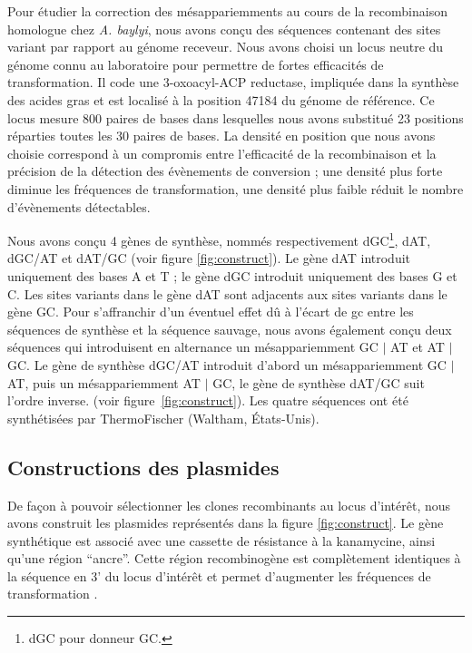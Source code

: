 Pour étudier la correction des mésappariemments au cours de la recombinaison
homologue chez \emph{A. baylyi}, nous avons conçu des séquences contenant des
sites variant par rapport au génome receveur. Nous avons choisi un locus neutre
du génome connu au laboratoire pour permettre de fortes efficacités de
transformation. Il code une 3-oxoacyl-ACP reductase, impliquée dans la synthèse
des acides gras\cite{vallenet_microscopeintegrated_2013} et est localisé à la
position \num{47184} du génome de référence. Ce locus mesure \num{800} paires de
bases dans lesquelles nous avons substitué \num{23} positions réparties toutes
les \num{30} paires de bases. La densité en position que nous avons choisie
correspond à un compromis entre l'efficacité de la recombinaison et la précision
de la détection des évènements de conversion ; une densité plus forte diminue
les fréquences de transformation, une densité plus faible réduit le nombre
d'évènements détectables.

Nous avons conçu 4 gènes de synthèse, nommés respectivement dGC\footnote{dGC
  pour donneur GC.}, dAT, dGC/AT et dAT/GC (voir figure \ref{fig:construct}). Le
gène dAT introduit uniquement des bases A et T ; le gène dGC introduit
uniquement des bases G et C. Les sites variants dans le gène dAT sont adjacents
aux sites variants dans le gène GC. Pour s'affranchir d'un éventuel effet dû à
l'écart de \ac{gc} entre les séquences de synthèse et la séquence sauvage, nous
avons également conçu deux séquences qui introduisent en alternance un
mésappariemment GC $|$ AT et AT $|$ GC. Le gène de synthèse dGC/AT introduit
d'abord un mésappariemment GC $|$ AT, puis un mésappariemment AT $|$ GC, le gène
de synthèse dAT/GC suit l'ordre inverse. (voir figure~\ref{fig:construct}). Les
quatre séquences ont été synthétisées par ThermoFischer (Waltham, États-Unis).

\subsection{Constructions des plasmides}
\label{subsec:constructions}

De façon à pouvoir sélectionner les clones recombinants au locus d'intérêt, nous
avons construit les plasmides représentés dans la figure \ref{fig:construct}. Le
gène synthétique est associé avec une cassette de résistance à la kanamycine,
ainsi qu'une région ``ancre''. Cette région recombinogène est complètement
identiques à la séquence en 3' du locus d'intérêt et permet d'augmenter les
fréquences de transformation
\cite{de_vries_integration_2002,meier_mechanisms_2003}.

